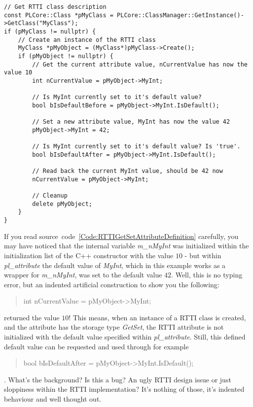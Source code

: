 \begin{lstlisting}[label=Code:RTTIGetSetAttributeUsage,caption={Accessing an RTTI class attribute using getter and setter methods}]
// Get RTTI class description
const PLCore::Class *pMyClass = PLCore::ClassManager::GetInstance()->GetClass("MyClass");
if (pMyClass != nullptr) {
	// Create an instance of the RTTI class
	MyClass *pMyObject = (MyClass*)pMyClass->Create();
	if (pMyObject != nullptr) {
		// Get the current attribute value, nCurrentValue has now the value 10
		int nCurrentValue = pMyObject->MyInt;

		// Is MyInt currently set to it's default value?
		bool bIsDefaultBefore = pMyObject->MyInt.IsDefault();

		// Set a new attribute value, MyInt has now the value 42
		pMyObject->MyInt = 42;

		// Is MyInt currently set to it's default value? Is 'true'.
		bool bIsDefaultAfter = pMyObject->MyInt.IsDefault();

		// Read back the current MyInt value, should be 42 now
		nCurrentValue = pMyObject->MyInt;

		// Cleanup
		delete pMyObject;
	}
}
\end{lstlisting}

If you read source~code~\ref{Code:RTTIGetSetAttributeDefinition} carefully, you may have noticed that the internal variable \emph{m\_nMyInt} was initialized within the initialization list of the C++ constructor with the value $10$ - but within \emph{pl\_attribute} the default value of \emph{MyInt}, which in this example works as a wrapper for \emph{m\_nMyInt}, was set to the default value $42$. Well, this is no typing error, but an indented artificial construction to show you the following: \begin{quote}int nCurrentValue = pMyObject->MyInt;\end{quote} returned the value $10$! This means, when an instance of a RTTI class is created, and the attribute has the storage type \emph{GetSet}, the RTTI attribute is not initialized with the default value specified within \emph{pl\_attribute}. Still, this defined default value can be requested and used through for example \begin{quote}bool bIsDefaultAfter = pMyObject->MyInt.IsDefault();\end{quote}. What's the background? Is this a bug? An ugly RTTI design issue or just sloppiness within the RTTI implementation? It's nothing of those, it's indented behaviour and well thought out.

